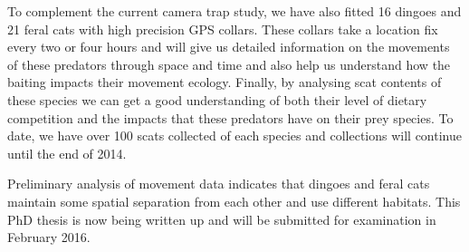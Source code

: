\documentclass[version=last, 
    paper=a4, %
    10pt, %
    usenames,
    dvipsnames, 
    oneside, %
    headings=openany, %
    DIV=15 %
]{scrbook}
\begin{document}
To complement the current camera trap study, we have also fitted 16
dingoes and 21 feral cats with high precision GPS collars. These collars
take a location fix every two or four hours and will give us detailed
information on the movements of these predators through space and time
and also help us understand how the baiting impacts their movement
ecology. Finally, by analysing scat contents of these species we can get
a good understanding of both their level of dietary competition and the
impacts that these predators have on their prey species. To date, we
have over 100 scats collected of each species and collections will
continue until the end of 2014.

Preliminary analysis of movement data indicates that dingoes and feral
cats maintain some spatial separation from each other and use different
habitats. This PhD thesis is now being written up and will be submitted
for examination in February 2016.



\end{document}
